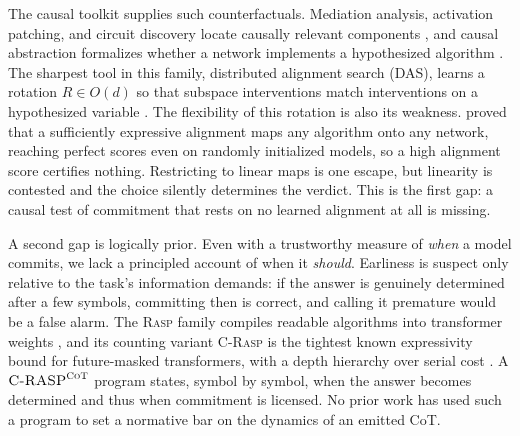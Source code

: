 \documentclass[11pt]{article}
\newcommand{\CRASPCoT}{\textsc{C-RASP}^{\textsc{CoT}}}
\begin{document}
The causal toolkit supplies such counterfactuals. Mediation analysis, activation
patching, and circuit discovery locate causally relevant components
\citep{DBLP:conf/emnlp/StolfoBS23,DBLP:conf/nips/MengBAB22,DBLP:journals/corr/abs-2404-15255,DBLP:conf/iclr/WangVCSS23},
and causal abstraction formalizes whether a network implements a hypothesized
algorithm \citep{DBLP:journals/jmlr/GeigerIZCC0AWGP25}. The sharpest tool in
this family, distributed alignment search (DAS), learns a rotation $R\!\in\!O(d)$ so that
subspace interventions match interventions on a hypothesized variable
\citep{DBLP:conf/clear2/GeigerWPIG24}. The flexibility of this rotation is also
its weakness. \citet{sutter2025nonlinear} proved that a sufficiently expressive
alignment maps any algorithm onto any network, reaching perfect scores even on
randomly initialized models, so a high alignment score certifies nothing.
Restricting to linear maps is one escape, but linearity is contested
\citep{DBLP:conf/icml/ParkCV24,DBLP:conf/iclr/BurnsYKS23} and the choice
silently determines the verdict. This is the first gap: a causal test of
commitment that rests on no learned alignment at all is missing.

A second gap is logically prior. Even with a trustworthy measure of
\emph{when} a model commits, we lack a principled account of when it
\emph{should}. Earliness is suspect only relative to the task's information
demands: if the answer is genuinely determined after a few symbols, committing
then is correct, and calling it premature would be a false alarm. The
\textsc{Rasp} family compiles readable algorithms into transformer
weights \citep{DBLP:conf/icml/WeissGY21}, and its
counting variant \textsc{C-Rasp} is the tightest known expressivity bound for
future-masked transformers, with a depth hierarchy over serial cost
\citep{DBLP:conf/nips/YangCCN25}. A $\CRASPCoT$ program states, symbol by
symbol, when the answer becomes determined and thus when commitment is licensed.
No prior work has used such a program to set a normative bar on the dynamics of
an emitted CoT.
\end{document}
